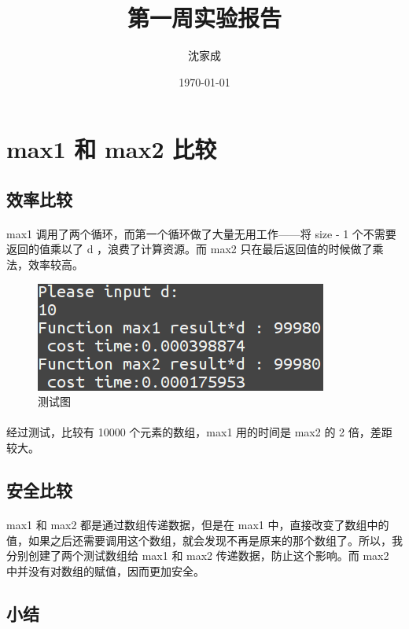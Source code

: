 \documentclass[UTF-8, 12pt]{ctexart}
\title{第一周实验报告}
\author{沈家成}
\date{\today}
\begin{document}
\maketitle

\section{max1 和 max2 比较}
    \subsection{效率比较}
    \paragraph{}
    max1 调用了两个循环，而第一个循环做了大量无用工作——将 size - 1 个不需要返回的值乘以了 d ，浪费了计算资源。而 max2 只在最后返回值的时候做了乘法，效率较高。
    \begin{figure}[h]
    \centering
    \includegraphics[width = .8\textwidth]{1.png}
    \caption{测试图}
    \end{figure}
    \paragraph{}
    经过测试，比较有 10000 个元素的数组，max1 用的时间是 max2 的 2 倍，差距较大。

    \subsection{安全比较}
    \paragraph{}
    max1 和 max2 都是通过数组传递数据，但是在 max1 中，直接改变了数组中的值，如果之后还需要调用这个数组，就会发现不再是原来的那个数组了。所以，我分别创建了两个测试数组给 max1 和 max2 传递数据，防止这个影响。而 max2 中并没有对数组的赋值，因而更加安全。

    \subsection{小结}
\end{document}
